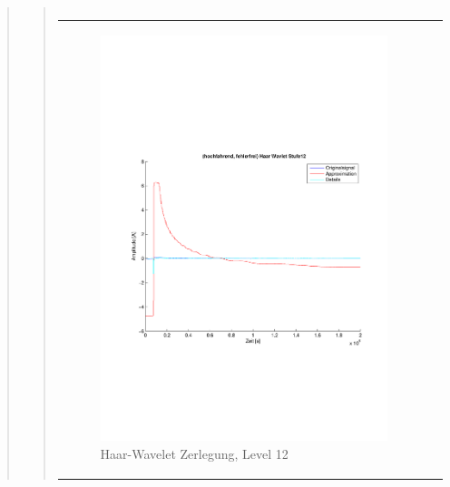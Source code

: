 \begin{quote}
\begin{quote}
\begin{center}
\begin{tabular}{ll}
                \end{tabular}
                \end{center}
    
                
                
                    \begin{center}
                \begin{tabular}{ll}
    
                \hspace{-8em}
                    \begin{minipage}{0.6\textwidth}
    
                        \begin{figure}[H]
                            \label{fig:}
                            \includegraphics[scale=0.4, trim = 2cm 6cm 1cm
                            7.5cm,
                            clip]{./Bilder/Termin8/fehlerfrei_hochlaufen_Haar_Wavlet_lvl_12}
                            \caption{Haar-Wavelet Zerlegung, Level 12}
                        \end{figure}
    

\end{minipage}
\end{tabular}
\end{center}
\end{quote}
\end{quote}
